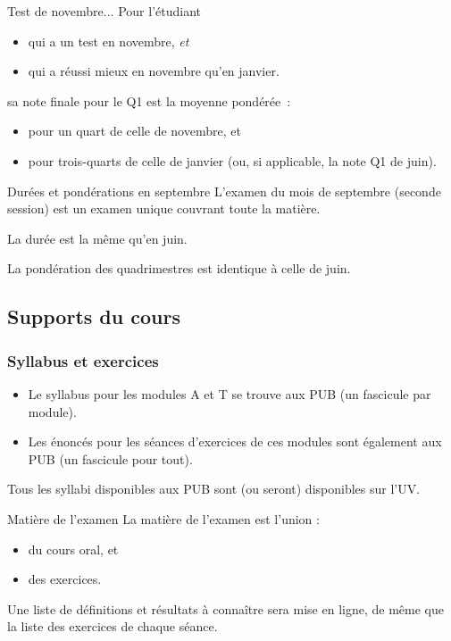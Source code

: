 \documentclass[french,xcolor=svgnames]{beamer}
\begin{document}
\begin{frame}{Test de novembre...}
  Pour l'étudiant
  \begin{itemize}
  \item qui a un test en novembre, \emph{et}
  \item qui a réussi mieux en novembre qu'en janvier.
  \end{itemize}
  sa note finale pour le Q1 est la moyenne pondérée~:
  \begin{itemize}
  \item pour un quart de celle de novembre, et
  \item pour trois-quarts de celle de janvier (ou, si applicable, la \og note Q1\fg{} de juin).
  \end{itemize}
\end{frame}
\begin{frame}{Durées et pondérations en septembre}
  L'examen du mois de septembre (\og seconde session\fg) est un examen \alert{unique} couvrant \alert{toute la matière}.

  La durée est la même qu'en juin.

  \pause{} La pondération des quadrimestres est identique à celle de juin.
\end{frame}

\subsection{Supports du cours}
\begin{frame}
  \frametitle{Syllabus et exercices}
  \begin{itemize}[<+->]
  \item Le syllabus pour les modules A et T se trouve aux PUB (un fascicule par module).
  \item Les énoncés pour les séances d'exercices de ces modules sont également aux PUB (un fascicule pour tout).
  \end{itemize}\pause
  Tous les syllabi disponibles aux PUB sont (ou seront) disponibles sur l'UV.\pause{}
  
  \begin{block}{Matière de l'examen}
    La matière de l'examen est l'union :\pause{}
    \begin{itemize}
    \item du cours oral, et\pause{}
    \item des exercices.
    \end{itemize}\pause{}

    Une liste de définitions et résultats à connaître sera mise en ligne, de même que la liste des exercices de chaque séance.
  \end{block}
\end{frame}
\end{document}
